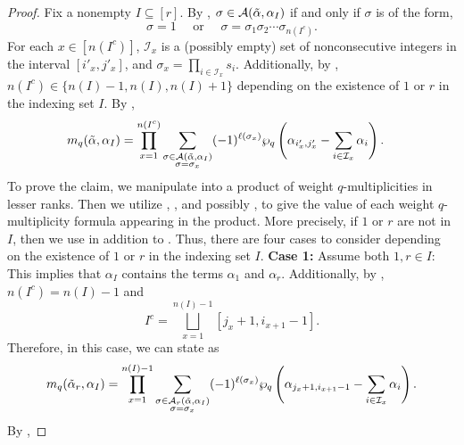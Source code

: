 \documentclass[10pt]{article}
\newcommand{\hr}[0]{\Tilde{\alpha}}
\newcommand{\newmu}[0]{\alpha_I}
\newcommand{\thealtset}[0]{\mathcal{A}(\hr,\newmu)}
\newcommand{\qpartition}[1]{\wp_q\left(#1\right)}
\begin{document}
\begin{proof} 
    Fix a nonempty $I\subseteq [r]$.
    By , $\sigma\in \thealtset$ if and only if $\sigma$ is of the form,
    \[\sigma=1 \quad \text{ or } \quad \sigma = \sigma_1\sigma_2\cdots \sigma_{n(I^c)}.\]
    For each $x\in [n(I^c)]$, $\mathcal{I}_x$ is a (possibly empty) set of nonconsecutive integers in the interval $[i'_x,j'_x]$, and $\sigma_x=\prod_{i\in\mathcal{I}_x}s_i$. Additionally, by , $n(I^c)\in\{n(I)-1,n(I),n(I)+1\}$ depending on the existence of $1$ or $r$ in the indexing set $I$. By ,
    \begin{align}
        m_q(\hr,\alpha_I) &= \prod_{x=1}^{n(I^c)} \sum_{\substack{\sigma\in\thealtset\\ \sigma=\sigma_x}}(-1)^{\ell(\sigma_x)}\qpartition{\alpha_{i'_x,j'_x}-\sum_{i\in\mathcal{I}_x}\alpha_i}.\label{big result starting point}
    \end{align}
    To prove the claim, we manipulate  into a product of weight $q$-multiplicities in lesser ranks.  
    Then we utilize , , and possibly , to give the value of each weight $q$-multiplicity formula appearing in the product. More precisely, if $1$ or $r$ are not in $I$, then we use  in addition to . Thus, there are four cases to consider depending on the existence of $1$ or $r$ in the indexing set $I$. 
    \newline\noindent\textbf{Case 1:} Assume both $1,r\in I$: \\
    This implies that $\alpha_I$ contains the terms $\alpha_1$ and $\alpha_r$. Additionally, by , $n(I^c)=n(I)-1$ and 
    \begin{equation}
        I^c=\bigsqcup_{x=1}^{n(I)-1} [j_x+1,i_{x+1}-1].\label{interval for case 1}
    \end{equation}
    Therefore, in this case, we can state  as
    \begin{equation}
        m_q(\hr_r,\alpha_I) = \prod_{x=1}^{n(I)-1}\sum_{\substack{\sigma\in\mathcal{A}_r(\hr,\alpha_I)\\ \sigma=\sigma_x}}(-1)^{\ell(\sigma_x)}\qpartition{\alpha_{j_x+1,i_{x+1}-1}-\sum_{i\in\mathcal{I}_x}\alpha_i}.\label{big theorem case 1 start}
    \end{equation}
    By , 

\end{proof}
\end{document}
